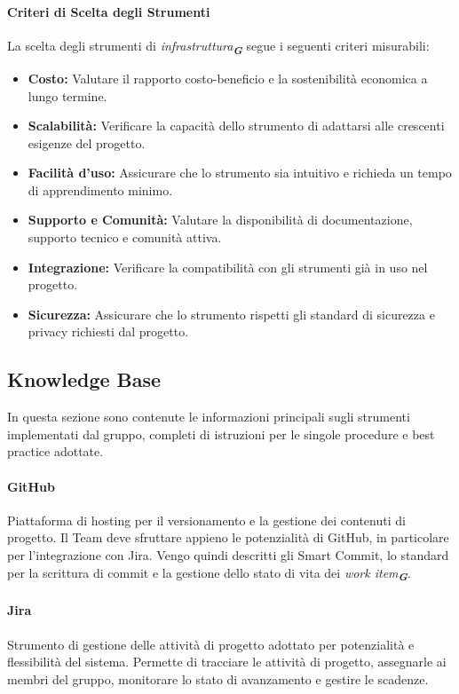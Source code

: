 \documentclass[a4paper,12pt]{article}
\newcommand{\glossario}[1]{\textit{#1}\textsubscript{\textbf{\textit{\textcolor{lightblack}{G}}}}}
\begin{document}
\paragraph{Criteri di Scelta degli Strumenti}
La scelta degli strumenti di \glossario{infrastruttura} segue i seguenti criteri misurabili:
\begin{itemize}
    \item \textbf{Costo:} Valutare il rapporto costo-beneficio e la sostenibilità economica a lungo termine.
    \item \textbf{Scalabilità:} Verificare la capacità dello strumento di adattarsi alle crescenti esigenze del progetto.
    \item \textbf{Facilità d'uso:} Assicurare che lo strumento sia intuitivo e richieda un tempo di apprendimento minimo.
    \item \textbf{Supporto e Comunità:} Valutare la disponibilità di documentazione, supporto tecnico e comunità attiva.
    \item \textbf{Integrazione:} Verificare la compatibilità con gli strumenti già in uso nel progetto.
    \item \textbf{Sicurezza:} Assicurare che lo strumento rispetti gli standard di sicurezza e privacy richiesti dal progetto.
\end{itemize}

\subsection{Knowledge Base} \label{knowladge_base}
In questa sezione sono contenute le informazioni principali sugli strumenti implementati dal gruppo, completi di istruzioni per le singole procedure e best practice adottate.
\paragraph{GitHub} \label{GitHub}
Piattaforma di hosting per il versionamento e la gestione dei contenuti di
progetto. Il Team deve sfruttare appieno le potenzialità di GitHub, in
particolare per l'integrazione con Jira. Vengo quindi descritti gli Smart
Commit, lo standard per la scrittura di commit e la gestione dello stato di
vita dei \glossario{work item}.

\paragraph{Jira} \label{Jira}
Strumento di gestione delle attività di progetto adottato per potenzialità e
flessibilità del sistema. Permette di tracciare le attività di progetto,
assegnarle ai membri del gruppo, monitorare lo stato di avanzamento e gestire
le scadenze.\\
\end{document}
